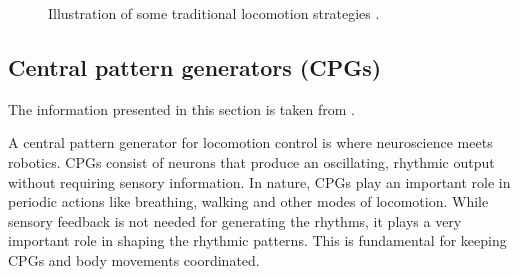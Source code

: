 
\begin{figure}%
    \centering
    



    \caption{Illustration of some traditional locomotion strategies \cite{liljeback2012snake}.}
    \label{fig:traditional_locomotion}
\end{figure}


\subsection{Central pattern generators (CPGs)}

The information presented in this section is taken from \cite{ijspeert2008central}.

A central pattern generator for locomotion control is where neuroscience meets robotics. CPGs consist of neurons that produce an oscillating, rhythmic output without requiring sensory information. In nature, CPGs play an important role in periodic actions like breathing, walking and other modes of locomotion. While sensory feedback is not needed for generating the rhythms, it plays a very important role in shaping the rhythmic patterns. This is fundamental for keeping CPGs and body movements coordinated.

